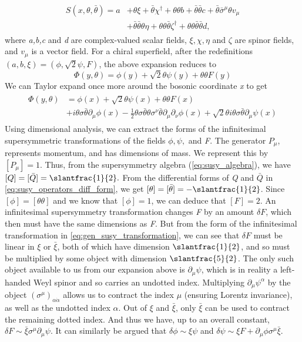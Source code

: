 \begin{align}
  \begin{split}
  S(x,\theta,\bar{\theta}) = a &+ \theta\xi + \bar{\theta}\chi^\dagger + \theta\theta b + \bar{\theta}\bar{\theta}c+\bar{\theta}\bar{\sigma}^\mu\theta v_\mu \\
  &+ \bar{\theta}\bar{\theta}\theta\eta + \theta\theta\bar{\theta}\zeta^\dagger+\theta\theta\bar{\theta}\bar{\theta}d,
\end{split}
  \label{eq:general_superfield_expansion}
\end{align}
where \emph{a,b,c} and \emph{d} are complex-valued scalar fields, $\xi,\chi,\eta$ and $\zeta$ are spinor fields, and $v_\mu$ is a vector field. 
For a chiral superfield, after the redefinitions $(a,b,\xi) = (\phi,\sqrt{2}\psi,F)$, the above expansion reduces to
\[\Phi(y,\theta) = \phi(y) + \sqrt{2}\theta\psi(y)+\theta\theta F(y)\]
We can Taylor expand once more around the bosonic coordinate \emph{x} to get
\begin{align}
  \begin{split}
  \Phi(y,\theta) &= \phi(x) + \sqrt{2}\theta\psi(x)+\theta\theta F(x)\\
  &+i\theta\sigma\bar{\theta}\partial_\mu\phi(x)-\frac{1}{2}\theta\sigma\bar{\theta}\theta\sigma^\nu\bar{\theta}\partial_\mu\partial_\nu\phi(x) + \sqrt{2}\theta i\theta\sigma\bar{\theta}\partial_\mu\psi(x)
\end{split}
  \label{eq:superfield_expansion}
\end{align}
Using dimensional analysis, we can extract the forms of the infinitesimal supersymmetric transformations of the fields $\phi,\psi,$ and \emph{F}. The generator $P_\mu$, represents momentum, and has dimensions of mass. We represent this by $[P_\mu] = 1$. Thus, from the supersymmetry algebra (\eqref{eq:susy_algebra}), we have $[Q] = [\bar{Q}] = \slantfrac{1}{2}.$ From the differential forms of \emph{Q} and $\bar{Q}$ in \eqref{eq:susy_operators_diff_form}, we get $[\theta]=[\bar{\theta}]=-\slantfrac{1}{2}$. Since $[\phi] = [\theta\theta]$ and we know that $[\phi] = 1$, we can deduce that $[F]=2$. An infinitesimal supersymmetry transformation changes \emph{F} by an amount $\delta F$, which then must have the same dimensions as \emph{F}. But from the form of the infinitesimal transformation in \eqref{eq:gen_susy_transformation}, we can see that $\delta F$ must be linear in $\xi$ or $\bar{\xi}$, both of which have dimension $\slantfrac{1}{2}$, and so must be multiplied by some object with dimension $\slantfrac{5}{2}$. The only such object available to us from our expansion above is $\partial_\mu\psi$, which is in reality a left-handed Weyl spinor and so carries an undotted index. Multiplying $\partial_\mu\psi^\alpha$ by the object $(\sigma^\mu)_{\alpha\dot{\alpha}}$ allows us to contract the index $\mu$ (ensuring Lorentz invariance), as well as the undotted index $\alpha$. Out of $\xi$ and $\bar{\xi}$, only $\bar{\xi}$ can be used to contract the remaining dotted index. And thus we have, up to an overall constant, $\delta F\sim\bar{\xi}\sigma^\mu\partial_\mu\psi$. It can similarly be argued that $\delta\phi\sim\xi\psi$ and $\delta\psi\sim\xi F+\partial_\mu\phi\sigma^\mu\bar{\xi}$.
